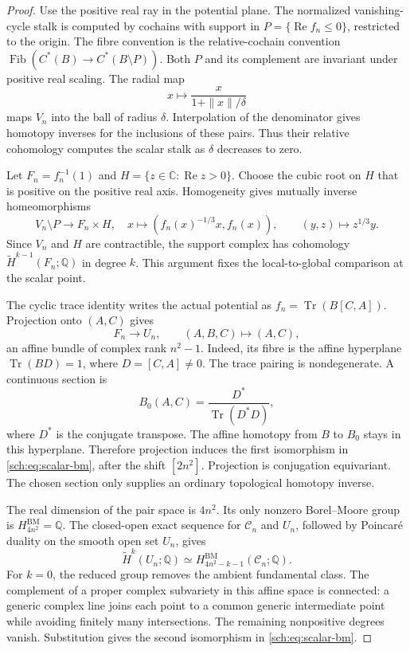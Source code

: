 \begin{proof}
Use the positive real ray in the potential plane. The normalized
vanishing-cycle stalk is computed by cochains with support in
$P=\{\operatorname{Re}f_n\leq0\}$, restricted to the origin.
The fibre convention is the relative-cochain convention
$\operatorname{Fib}(C^*(B)\to C^*(B\setminus P))$.
Both $P$ and its complement are invariant under positive real scaling.
The radial map
\[
 x\longmapsto \frac{x}{1+\|x\|/\delta}
\]
maps $V_n$ into the ball of radius $\delta$. Interpolation of the
denominator gives homotopy inverses for the inclusions of these pairs.
Thus their relative cohomology computes the scalar stalk as
$\delta$ decreases to zero.

Let $F_n=f_n^{-1}(1)$ and $H=\{z\in\mathbb C:\operatorname{Re}z>0\}$.
Choose the cubic root on $H$ that is positive on the positive real axis.
Homogeneity gives mutually inverse homeomorphisms
\[
 V_n\setminus P\longrightarrow F_n\times H,
 \quad x\longmapsto(f_n(x)^{-1/3}x,f_n(x)),
 \qquad (y,z)\longmapsto z^{1/3}y.
\]
Since $V_n$ and $H$ are contractible, the support complex has
cohomology $\widetilde H^{k-1}(F_n;\mathbb Q)$ in degree $k$.
This argument fixes the local-to-global comparison at the scalar point.

The cyclic trace identity writes the actual potential as
$f_n=\operatorname{Tr}(B[C,A])$. Projection onto $(A,C)$ gives
\begin{equation}
 F_n\longrightarrow U_n,
 \qquad (A,B,C)\longmapsto(A,C),
 \label{sch:eq:affine-fibre}
\end{equation}
an affine bundle of complex rank $n^2-1$. Indeed, its fibre is the
affine hyperplane $\operatorname{Tr}(BD)=1$, where $D=[C,A]\ne0$.
The trace pairing is nondegenerate. A continuous section is
\[
 B_0(A,C)=\frac{D^*}{\operatorname{Tr}(D^*D)},
\]
where $D^*$ is the conjugate transpose. The affine homotopy from $B$
to $B_0$ stays in this hyperplane. Therefore projection induces the
first isomorphism in \eqref{sch:eq:scalar-bm}, after the shift $[2n^2]$.
Projection is conjugation equivariant. The chosen section only supplies
an ordinary topological homotopy inverse.

The real dimension of the pair space is $4n^2$. Its only nonzero
Borel--Moore group is $H^{\mathrm{BM}}_{4n^2}=\mathbb Q$.
The closed-open exact sequence for $\mathcal C_n$ and $U_n$, followed
by Poincar\'e duality on the smooth open set $U_n$, gives
\[
 \widetilde H^k(U_n;\mathbb Q)
       \simeq H^{\mathrm{BM}}_{4n^2-k-1}(\mathcal C_n;\mathbb Q).
\]
For $k=0$, the reduced group removes the ambient fundamental class.
The complement of a proper complex subvariety in this affine space
is connected: a generic complex line joins each point to a common
generic intermediate point while avoiding finitely many intersections.
The remaining nonpositive degrees vanish. Substitution gives the
second isomorphism in \eqref{sch:eq:scalar-bm}.


\end{proof}
